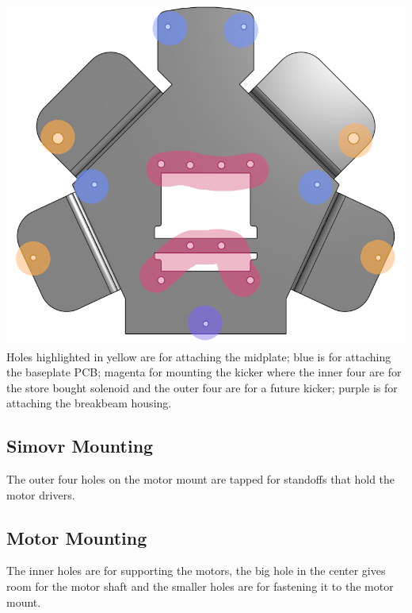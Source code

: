 \documentclass{iopart}
\begin{document}
\begin{center}
    \includegraphics{graphics/mount_holes.png}\\
    Holes highlighted in yellow are for attaching the midplate; blue is for attaching the baseplate PCB; magenta for mounting the kicker where the inner four are for the store bought solenoid and the outer four are for a future kicker; purple is for attaching the breakbeam housing.
\end{center}

\subsection{Simovr Mounting}
The outer four holes on the motor mount are tapped for standoffs that hold the motor drivers.

\subsection{Motor Mounting}
The inner holes are for supporting the motors, the big hole in the center gives room for the motor shaft and the smaller holes are for fastening it to the motor mount.
\end{document}
